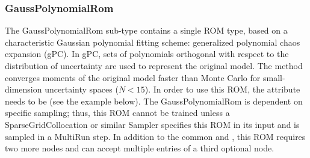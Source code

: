 \subsubsection{GaussPolynomialRom}
\label{subsubsec:GaussPolynomialRom}
The GaussPolynomialRom sub-type contains a single ROM type, based on a
characteristic Gaussian polynomial fitting scheme: generalized polynomial chaos
expansion (gPC).
%
In gPC, sets of polynomials orthogonal with respect to the distribution of uncertainty
are used to represent the original model.  The method converges moments of the original
model faster than Monte Carlo for small-dimension uncertainty spaces ($N<15$).
%
In order to use this ROM, the  attribute  needs to
be  (see the example below).
%
The GaussPolynomialRom is dependent on specific sampling; thus, this ROM cannot be trained unless a
SparseGridCollocation or similar Sampler specifies this ROM in its input and is sampled in a MultiRun step.
%
In addition to the common  and , this ROM requires
two more nodes and can accept multiple entries of a third optional node.
